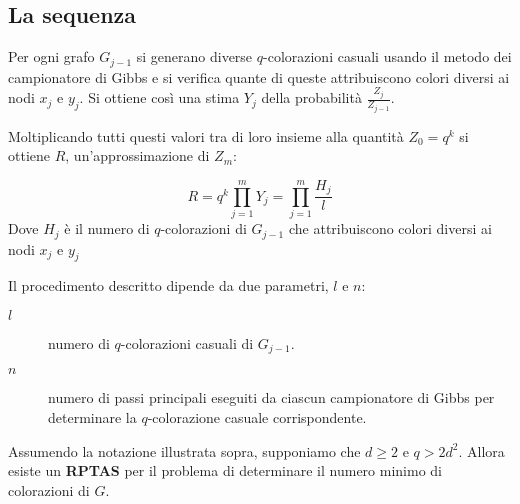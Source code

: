 \documentclass[\main/main.tex]{subfiles}
\begin{document}
\subsection{La sequenza}
Per ogni grafo \(G_{j-1}\) si generano diverse \(q\)-colorazioni casuali usando il metodo dei campionatore di Gibbs e si verifica quante di queste attribuiscono colori diversi ai nodi \(x_j\) e \(y_j\). Si ottiene così una stima \(Y_j\) della probabilità \(\frac{Z_j}{Z_{j-1}}\).

Moltiplicando tutti questi valori tra di loro insieme alla quantità \(Z_0 = q^k\) si ottiene \(R\), un'approssimazione di \(Z_m\):

\[
  R = q^k \prod_{j=1}^m Y_j = \prod_{j=1}^m \frac{H_j}{l}
\]
Dove \(H_j\) è il numero di \(q\)-colorazioni di \(G_{j-1}\) che attribuiscono colori diversi ai nodi \(x_j\) e \(y_j\)

Il procedimento descritto dipende da due parametri, \(l\) e \(n\):
\begin{description}
  \item[\(l\)] numero di \(q\)-colorazioni casuali di \(G_{j-1}\).
  \item[\(n\)] numero di passi principali eseguiti da ciascun campionatore di Gibbs per determinare la \(q\)-colorazione casuale corrispondente.
\end{description}

\begin{theorem}
  Assumendo la notazione illustrata sopra, supponiamo che \(d\geq2\) e \(q>2d^2\). Allora esiste un \textbf{RPTAS} per il problema di determinare il numero minimo di colorazioni di \(G\).
\end{theorem}
\end{document}
